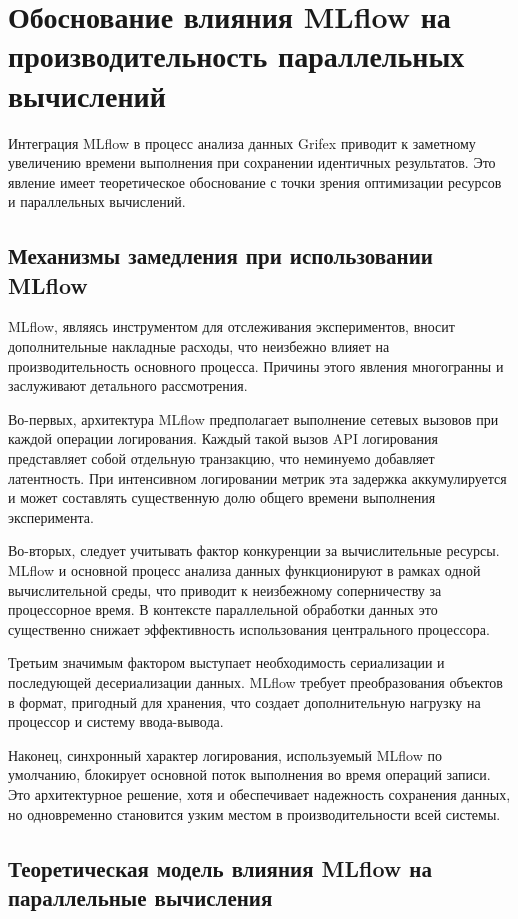 \section{Обоснование влияния MLflow на производительность параллельных вычислений}

Интеграция MLflow в процесс анализа данных Grifex приводит к заметному
увеличению времени выполнения при сохранении идентичных результатов. Это явление
имеет теоретическое обоснование с точки зрения оптимизации ресурсов и
параллельных вычислений.

\subsection{Механизмы замедления при использовании MLflow}

MLflow, являясь инструментом для отслеживания экспериментов, вносит
дополнительные накладные расходы, что неизбежно влияет на производительность
основного процесса. Причины этого явления многогранны и заслуживают детального
рассмотрения.

Во-первых, архитектура MLflow предполагает выполнение сетевых вызовов при каждой
операции логирования. Каждый такой вызов API логирования представляет собой
отдельную транзакцию, что неминуемо добавляет латентность. При интенсивном
логировании метрик эта задержка аккумулируется и может составлять
существенную долю общего времени выполнения эксперимента.

Во-вторых, следует учитывать фактор конкуренции за вычислительные ресурсы.
MLflow и основной процесс анализа данных функционируют в рамках одной
вычислительной среды, что приводит к неизбежному соперничеству за процессорное
время. В контексте параллельной обработки данных это существенно снижает
эффективность использования центрального процессора.

Третьим значимым фактором выступает необходимость сериализации и последующей
десериализации данных. MLflow требует преобразования объектов в формат,
пригодный для хранения, что создает дополнительную нагрузку на процессор и
систему ввода-вывода.

Наконец, синхронный характер логирования, используемый MLflow по умолчанию,
блокирует основной поток выполнения во время операций записи. Это архитектурное
решение, хотя и обеспечивает надежность сохранения данных, но одновременно
становится узким местом в производительности всей системы.

\subsection{Теоретическая модель влияния MLflow на параллельные вычисления}


